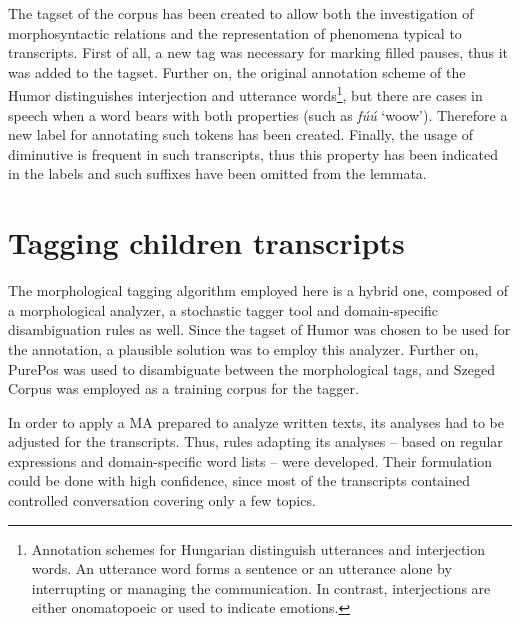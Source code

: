 The tagset of the corpus has been created to allow both the investigation of morphosyntactic relations and the representation of phenomena typical to transcripts. First of all, a new tag was necessary for marking filled pauses, thus it was added to the tagset. Further on, the original annotation scheme of the Humor distinguishes interjection and utterance words\footnote{Annotation schemes for Hungarian distinguish utterances and interjection words. An utterance word forms a sentence or an utterance alone by interrupting or managing the communication. In contrast, interjections are either onomatopoeic or used to indicate emotions.},
but there are cases in speech when a word bears with both properties (such as \textit{fúú} `woow’). Therefore a new label for annotating such tokens has been created. Finally, the usage of diminutive is frequent in such transcripts, thus this property has been indicated in the labels and such suffixes have been omitted from the lemmata. 

\section{Tagging children transcripts}
\label{sec:tagging}
The morphological tagging algorithm employed here is a hybrid one, composed of a morphological analyzer, a stochastic tagger tool and domain-specific disambiguation rules as well. Since the tagset of Humor was chosen to be used for the annotation, a plausible solution was to employ this analyzer. Further on, PurePos was used to disambiguate between the morphological tags, and Szeged Corpus was employed as a training corpus for the tagger. 

In order to apply a MA prepared to analyze written texts, its analyses had to be adjusted for the transcripts. Thus, rules adapting its analyses -- based on regular expressions and domain-specific word lists -- were developed. Their formulation could be done with high confidence, since most of the transcripts contained controlled conversation covering only a few topics. 

